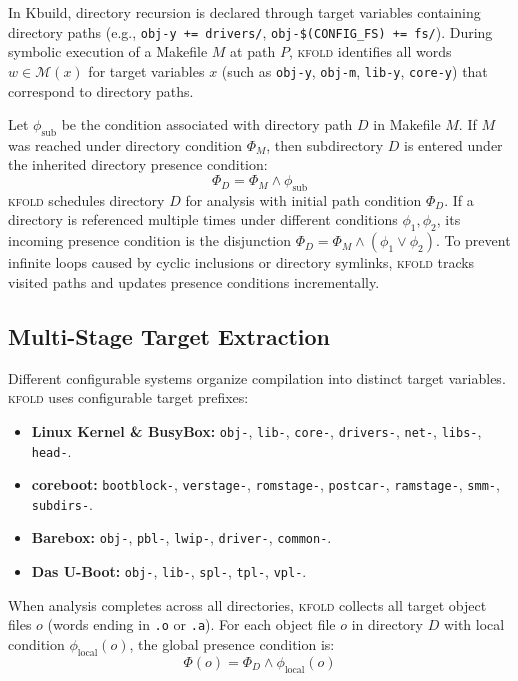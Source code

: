 \documentclass[acmsmall,screen,review]{acmart}
\newcommand{\tool}{\textsc{kfold}\xspace}
\begin{document}
In Kbuild, directory recursion is declared through target variables containing directory paths (e.g., \texttt{obj-y += drivers/}, \texttt{obj-\$(CONFIG\_FS) += fs/}). During symbolic execution of a Makefile $M$ at path $P$, \tool identifies all words $w \in \mathcal{M}(x)$ for target variables $x$ (such as \texttt{obj-y}, \texttt{obj-m}, \texttt{lib-y}, \texttt{core-y}) that correspond to directory paths.

Let $\phi_{\text{sub}}$ be the condition associated with directory path $D$ in Makefile $M$. If $M$ was reached under directory condition $\Phi_M$, then subdirectory $D$ is entered under the inherited directory presence condition:
$$\Phi_D = \Phi_M \wedge \phi_{\text{sub}}$$
\tool schedules directory $D$ for analysis with initial path condition $\Phi_D$. If a directory is referenced multiple times under different conditions $\phi_1, \phi_2$, its incoming presence condition is the disjunction $\Phi_D = \Phi_M \wedge (\phi_1 \vee \phi_2)$. To prevent infinite loops caused by cyclic inclusions or directory symlinks, \tool tracks visited paths and updates presence conditions incrementally.

\subsection{Multi-Stage Target Extraction}
\label{sec:traversal:stages}

Different configurable systems organize compilation into distinct target variables. \tool uses configurable target prefixes:
\begin{itemize}
\item \textbf{Linux Kernel \& BusyBox:} \texttt{obj-}, \texttt{lib-}, \texttt{core-}, \texttt{drivers-}, \texttt{net-}, \texttt{libs-}, \texttt{head-}.
\item \textbf{coreboot:} \texttt{bootblock-}, \texttt{verstage-}, \texttt{romstage-}, \texttt{postcar-}, \texttt{ramstage-}, \texttt{smm-}, \texttt{subdirs-}.
\item \textbf{Barebox:} \texttt{obj-}, \texttt{pbl-}, \texttt{lwip-}, \texttt{driver-}, \texttt{common-}.
\item \textbf{Das U-Boot:} \texttt{obj-}, \texttt{lib-}, \texttt{spl-}, \texttt{tpl-}, \texttt{vpl-}.
\end{itemize}

When analysis completes across all directories, \tool collects all target object files $o$ (words ending in \texttt{.o} or \texttt{.a}). For each object file $o$ in directory $D$ with local condition $\phi_{\text{local}}(o)$, the global presence condition is:
$$\Phi(o) = \Phi_D \wedge \phi_{\text{local}}(o)$$
\end{document}
